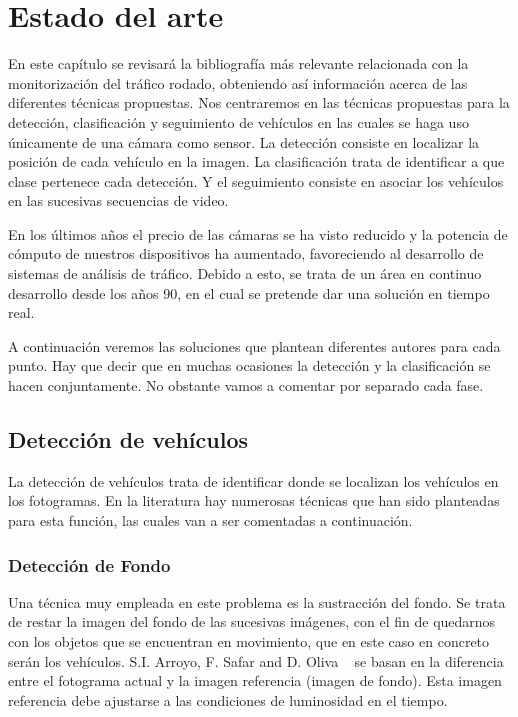 \chapter{Estado del arte}\label{cap.estado}

En este capítulo se revisará la bibliografía más relevante relacionada con la monitorización del tráfico rodado, obteniendo así información acerca de las diferentes técnicas propuestas. Nos centraremos en las técnicas propuestas para la detección, clasificación y seguimiento de vehículos en las cuales se haga uso únicamente de una cámara como sensor. La detección consiste en localizar la posición de cada vehículo en la imagen. La clasificación trata de identificar a que clase pertenece cada detección. Y el seguimiento consiste en asociar los vehículos en las sucesivas secuencias de video.

En los últimos años el precio de las cámaras se ha visto reducido y la potencia de cómputo de nuestros dispositivos ha aumentado, favoreciendo al desarrollo de sistemas de análisis de tráfico. Debido a esto, se trata de un área en continuo desarrollo desde los años 90, en el cual se pretende dar una solución en tiempo real. 

A continuación veremos las soluciones que plantean diferentes autores para cada punto. Hay que decir que en muchas ocasiones la detección y la clasificación se hacen conjuntamente. No obstante vamos a comentar por separado cada fase.

\section{Detección de vehículos} \label{ap.deteccion_vehiculos}

La detección de vehículos trata de identificar donde se localizan los vehículos en los fotogramas. En la literatura hay numerosas técnicas que han sido planteadas para esta función, las cuales van a ser comentadas a continuación. 

\subsection{Detección de Fondo}
Una técnica muy empleada en este problema es la sustracción del fondo. Se trata de restar la imagen del fondo de las sucesivas imágenes, con el fin de quedarnos con los objetos que se encuentran en movimiento, que en este caso en concreto serán los vehículos. S.I. Arroyo, F. Safar and D. Oliva ~\cite{probabilidad_infraccion} se basan en la diferencia entre el fotograma actual y la imagen referencia (imagen de fondo). Esta imagen referencia debe ajustarse a las condiciones de luminosidad en el tiempo.
 
